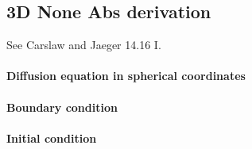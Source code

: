 \subsection{3D None Abs derivation}

See Carslaw and Jaeger 14.16 I.


\paragraph{Diffusion equation in spherical coordinates}


\paragraph{Boundary condition}


\paragraph{Initial condition}
